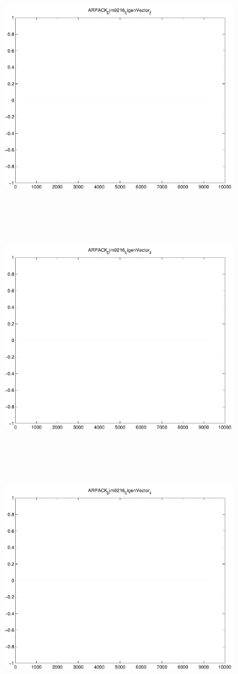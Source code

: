 \documentclass[9pt]{article}
\theoremstyle{plain}
\theoremstyle{definition}
\theoremstyle{remark}
\numberwithin{equation}{section}
\begin{document}
\includegraphics[width=10.0cm,height=10.0cm]{ARPACK_Dim9216_EigenVector_2.pdf}

\includegraphics[width=10.0cm,height=10.0cm]{ARPACK_Dim9216_EigenVector_3.pdf}

\includegraphics[width=10.0cm,height=10.0cm]{ARPACK_Dim9216_EigenVector_4.pdf}
\end{document}
